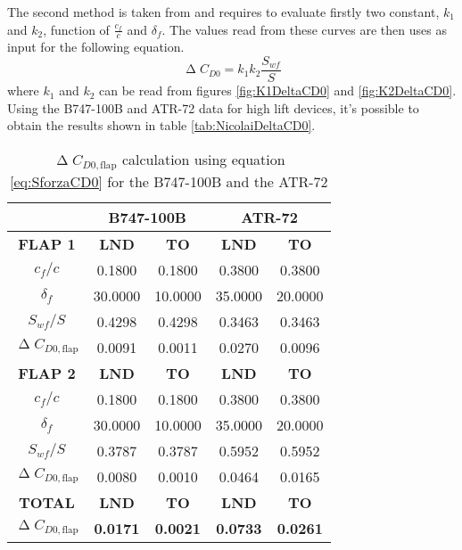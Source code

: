 \bigskip
\noindent
The second method is taken from \cite{nicolai2010fundamentals} and requires to evaluate firstly two constant, $k_1$ and $k_2$, function of $\frac{c_f}{c}$ and $\delta_f$. The values read from these curves are then uses as input for the following equation.
%
\begin{equation}
\upDelta C_{D0}=k_1k_2\dfrac{S_{wf}}{S}
\label{eq:NicolaiCD0}
\end{equation}
%
where $k_1$ and $k_2$ can be read from figures \ref{fig:K1DeltaCD0} and \ref{fig:K2DeltaCD0}. Using the B747-100B and ATR-72 data for high lift devices, it's possible to obtain the results shown in table \ref{tab:NicolaiDeltaCD0}.
%
\clearpage
\vspace*{0.5cm}
%
\begin{table}[H]
  \centering
    \begin{tabular}{c|cc|cc}
    \toprule
    \multicolumn{1}{c}{\textbf{}} & \multicolumn{2}{c}{\textbf{B747-100B}} & \multicolumn{2}{c}{\textbf{ATR-72}} \\
    \midrule
    \multicolumn{1}{c}{\textbf{FLAP 1}} & \multicolumn{1}{c}{\textbf{LND}} & \multicolumn{1}{c}{\textbf{TO}} & \multicolumn{1}{c}{\textbf{LND}} & \multicolumn{1}{c}{\textbf{TO}} \\
    \midrule
    $c_f/c$  & 0.1800 & 0.1800 & 0.3800 & 0.3800 \\
    $\delta_f$ & 30.0000 & 10.0000 & 35.0000 & 20.0000 \\
    $S_{wf}/S$ & 0.4298 & 0.4298 & 0.3463 & 0.3463 \\
    $\upDelta C_{D0,\text{flap}}$ & 0.0091 & 0.0011 & 0.0270 & 0.0096 \\
    \midrule
    \multicolumn{1}{c}{\textbf{FLAP 2}} & \multicolumn{1}{c}{\textbf{LND}} & \multicolumn{1}{c}{\textbf{TO}} & \multicolumn{1}{c}{\textbf{LND}} & \multicolumn{1}{c}{\textbf{TO}} \\
    \midrule
    $c_f/c$  & 0.1800 & 0.1800 & 0.3800 & 0.3800 \\
    $\delta_f$ & 30.0000 & 10.0000 & 35.0000 & 20.0000 \\
    $S_{wf}/S$ & 0.3787 & 0.3787 & 0.5952 & 0.5952 \\
    $\upDelta C_{D0,\text{flap}}$ & 0.0080 & 0.0010 & 0.0464 & 0.0165 \\
    \midrule
    \midrule
    \multicolumn{1}{c}{\textbf{TOTAL}} & \multicolumn{1}{c}{\textbf{LND}} & \multicolumn{1}{c}{\textbf{TO}} & \multicolumn{1}{c}{\textbf{LND}} & \multicolumn{1}{c}{\textbf{TO}} \\
    \midrule
    \textbf{$\upDelta C_{D0,\text{flap}}$} & \textbf{0.0171} & \textbf{0.0021} & \textbf{0.0733} & \textbf{0.0261} \\
    \bottomrule
    \end{tabular}
    \caption{$\upDelta C_{D0,\text{flap}}$ calculation using equation \ref{eq:SforzaCD0} for the B747-100B and the ATR-72}
    \label{tab:SforzaDeltaCD0}
\end{table}
